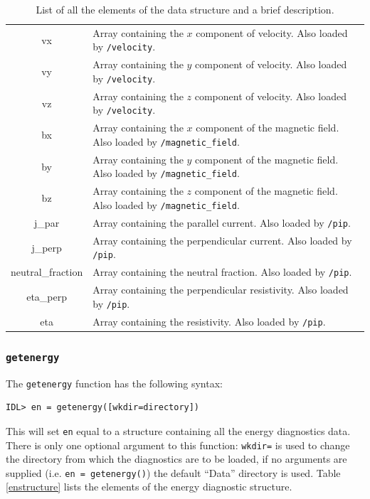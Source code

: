 \documentclass[11pt]{article}
\begin{document}
\begin{table}[!htbp]
\begin{center}
\begin{tabular}{|c|p{}|}
vx& Array containing the $x$ component of velocity. Also loaded by \texttt{/velocity}.\\
vy&Array containing the $y$ component of velocity. Also loaded by \texttt{/velocity}.\\
vz&Array containing the $z$ component of velocity. Also loaded by \texttt{/velocity}.\\
bx&Array containing the $x$ component of the magnetic field. Also loaded by \texttt{/magnetic\_field}.\\
by&Array containing the $y$ component of the magnetic field. Also loaded by \texttt{/magnetic\_field}.\\
bz&Array containing the $z$ component of the magnetic field. Also loaded by \texttt{/magnetic\_field}.\\
j\_par&Array containing the parallel current. Also loaded by \texttt{/pip}.\\
j\_perp&Array containing the perpendicular current. Also loaded by \texttt{/pip}.\\
neutral\_fraction&Array containing the neutral fraction. Also loaded by \texttt{/pip}.\\
eta\_perp&Array containing the perpendicular resistivity. Also loaded by \texttt{/pip}.\\
eta&Array containing the resistivity. Also loaded by \texttt{/pip}.\\
\hline
\end{tabular}
\end{center}
\caption{List of all the elements of the data structure and a brief description.}
\label{datastructure}
\end{table}

\subsubsection{\texttt{getenergy}}
The \texttt{getenergy} function has the following syntax:
\begin{verbatim}
IDL> en = getenergy([wkdir=directory])
\end{verbatim}
This will set \texttt{en} equal to a structure containing all the energy diagnostics data. There is only one 
optional argument to this function: \texttt{wkdir=} is used to change the directory from which the diagnostics 
are to be loaded, if no arguments are supplied (i.e. \texttt{en = getenergy()}) the default ``Data'' directory 
is used. Table \ref{enstructure} lists the elements of the energy diagnostic structure.
\end{document}
